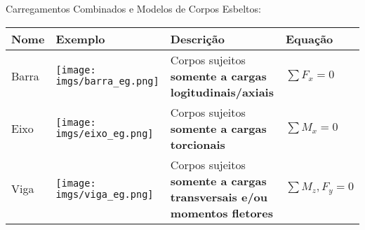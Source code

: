 \documentclass{article}
\begin{document}
                Carregamentos Combinados e Modelos de Corpos Esbeltos:
                \begin{table}[h]\tiny
                    \centering
                    \begin{tabularx}{\textwidth}{|l|X|l|X|}\hline
                        \textbf{Nome} & \textbf{Exemplo} & \textbf{Descrição} & \textbf{Equação} \\ \hline
                        Barra
                            &
                            \begin{minipage}{.4\textwidth}
                                \texttt{[image: imgs/barra\_eg.png]}
                            \end{minipage}
                            &
                                Corpos sujeitos \textbf{somente a cargas logitudinais/axiais}
                            &
                            $\sum F_x = 0$ \\ \hline
    
                        Eixo 
                            &
                            \begin{minipage}{.4\textwidth}
                                \vspace{10px}
                                \texttt{[image: imgs/eixo\_eg.png]}
                            \end{minipage}
                            &
                                Corpos sujeitos \textbf{somente a cargas torcionais}
                            &
                            $\sum M_x = 0$ \\ \hline
                        Viga 
                            &
                            \begin{minipage}{.4\textwidth}
                                \vspace{10px}
                                \texttt{[image: imgs/viga\_eg.png]}
                            \end{minipage}
                            &
                                Corpos sujeitos \textbf{somente a cargas transversais e/ou momentos fletores}
                            &
                            $\sum M_z,F_y = 0$ \\ \hline
    
                    \end{tabularx}
                \end{table}
\end{document}
